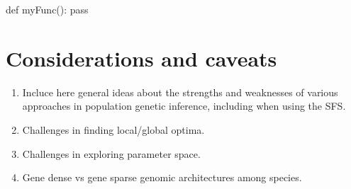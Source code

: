 \documentclass[]{article}
\begin{document}
\begin{python}
def myFunc():
    pass
\end{python}

\section{Considerations and caveats}

\begin{enumerate}
    \item Incluce here general ideas about the strengths and weaknesses of
        various approaches in population genetic inference, including when
        using the SFS.
    \item Challenges in finding local/global optima.
    \item Challenges in exploring parameter space.
    \item Gene dense vs gene sparse genomic architectures among species.
\end{enumerate}




\clearpage

\appendix
\renewcommand{\thesection}{A\arabic{section}}
\renewcommand{\theequation}{A\arabic{equation}}
\renewcommand{\thefigure}{A\arabic{figure}}
\renewcommand{\thetable}{A\arabic{table}}
\setcounter{figure}{0}
\setcounter{equation}{0}
\setcounter{table}{0}

\end{document}
